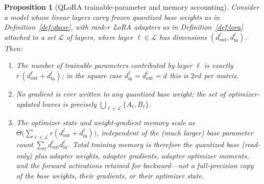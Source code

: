 \documentclass[11pt]{article}
\newtheorem{proposition}{Proposition}
\begin{document}
\begin{proposition}[QLoRA trainable-parameter and memory accounting]
\label{prop:qlora}
Consider a model whose linear layers carry frozen quantized base weights as in Definition~\ref{def:qbase}, with rank-$r$ LoRA adapters as in Definition~\ref{def:lora} attached to a set $\mathcal{L}$ of layers, where layer $\ell \in \mathcal{L}$ has dimensions $(d^{\ell}_{\text{out}}, d^{\ell}_{\text{in}})$. Then:
\begin{enumerate}
    \item The number of trainable parameters contributed by layer $\ell$ is exactly $r\,(d^{\ell}_{\text{out}} + d^{\ell}_{\text{in}})$; in the square case $d^{\ell}_{\text{in}} = d^{\ell}_{\text{out}} = d$ this is $2rd$ per matrix.
    \item No gradient is ever written to any quantized base weight; the set of optimizer-updated leaves is precisely $\bigcup_{\ell \in \mathcal{L}} \{A_\ell, B_\ell\}$.
    \item The optimizer state and weight-gradient memory scale as $\Theta\!\bigl(\sum_{\ell \in \mathcal{L}} r(d^{\ell}_{\text{out}} + d^{\ell}_{\text{in}})\bigr)$, independent of the (much larger) base parameter count $\sum_\ell d^{\ell}_{\text{out}} d^{\ell}_{\text{in}}$. Total training memory is therefore the quantized base (read-only) plus adapter weights, adapter gradients, adapter optimizer moments, and the forward activations retained for backward---\emph{not} a full-precision copy of the base weights, their gradients, or their optimizer state.
\end{enumerate}
\end{proposition}
\end{document}
